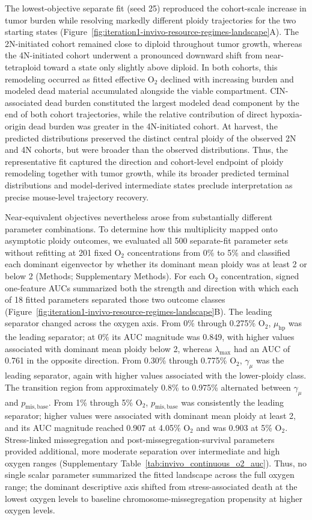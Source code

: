 \documentclass[11pt]{article}
\begin{document}
The lowest-objective separate fit (seed 25) reproduced the cohort-scale increase in tumor burden while resolving markedly different ploidy trajectories for the two starting states (Figure~\ref{fig:iteration1-invivo-resource-regimes-landscape}A). The 2N-initiated cohort remained close to diploid throughout tumor growth, whereas the 4N-initiated cohort underwent a pronounced downward shift from near-tetraploid toward a state only slightly above diploid. In both cohorts, this remodeling occurred as fitted effective O$_2$ declined with increasing burden and modeled dead material accumulated alongside the viable compartment. CIN-associated dead burden constituted the largest modeled dead component by the end of both cohort trajectories, while the relative contribution of direct hypoxia-origin dead burden was greater in the 4N-initiated cohort. At harvest, the predicted distributions preserved the distinct central ploidy of the observed 2N and 4N cohorts, but were broader than the observed distributions. Thus, the representative fit captured the direction and cohort-level endpoint of ploidy remodeling together with tumor growth, while its broader predicted terminal distributions and model-derived intermediate states preclude interpretation as precise mouse-level trajectory recovery.

Near-equivalent objectives nevertheless arose from substantially different parameter combinations. To determine how this multiplicity mapped onto asymptotic ploidy outcomes, we evaluated all 500 separate-fit parameter sets without refitting at 201 fixed O$_2$ concentrations from 0\% to 5\% and classified each dominant eigenvector by whether its dominant mean ploidy was at least 2 or below 2 (Methods; Supplementary Methods). For each O$_2$ concentration, signed one-feature AUCs summarized both the strength and direction with which each of 18 fitted parameters separated those two outcome classes (Figure~\ref{fig:iteration1-invivo-resource-regimes-landscape}B). The leading separator changed across the oxygen axis. From 0\% through 0.275\% O$_2$, \(\mu_{\mathrm{hp}}\) was the leading separator; at 0\% its AUC magnitude was 0.849, with higher values associated with dominant mean ploidy below 2, whereas \(\lambda_{\max}\) had an AUC of 0.761 in the opposite direction. From 0.30\% through 0.775\% O$_2$, \(\gamma_\mu\) was the leading separator, again with higher values associated with the lower-ploidy class. The transition region from approximately 0.8\% to 0.975\% alternated between \(\gamma_\mu\) and \(p_{\mathrm{mis,base}}\). From 1\% through 5\% O$_2$, \(p_{\mathrm{mis,base}}\) was consistently the leading separator; higher values were associated with dominant mean ploidy at least 2, and its AUC magnitude reached 0.907 at 4.05\% O$_2$ and was 0.903 at 5\% O$_2$. Stress-linked missegregation and post-missegregation-survival parameters provided additional, more moderate separation over intermediate and high oxygen ranges (Supplementary Table~\ref{tab:invivo_continuous_o2_auc}). Thus, no single scalar parameter summarized the fitted landscape across the full oxygen range; the dominant descriptive axis shifted from stress-associated death at the lowest oxygen levels to baseline chromosome-missegregation propensity at higher oxygen levels.
\end{document}

